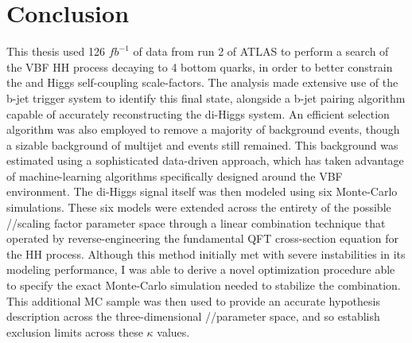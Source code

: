 \chapter{Conclusion}\label{chapter:conclusion}

This thesis used 126 $\textit{fb}^{-1}$ of data from run 2 of ATLAS
    to perform a search of the VBF \to HH process decaying to 4 bottom quarks,
    in order to better constrain the \kl and \kvv Higgs self-coupling scale-factors.
The analysis made extensive use of the b-jet trigger system to identify this final state,
    alongside a b-jet pairing algorithm capable of accurately reconstructing the di-Higgs system.
An efficient selection algorithm was also employed to remove a majority of background events,
    though a sizable background of multijet and \ttbar events still remained.
This background was estimated using a sophisticated data-driven approach,
    which has taken advantage of machine-learning algorithms specifically designed around the VBF environment.
The di-Higgs signal itself was then modeled using six Monte-Carlo simulations.
These six models were extended across the entirety of 
    the possible \kvv/\kl/\kvv scaling factor parameter space through a linear combination technique
    that operated by reverse-engineering the fundamental QFT cross-section equation for the HH process.
Although this method initially met with severe instabilities in its modeling performance,
    I was able to derive a novel optimization procedure able to specify
    the exact Monte-Carlo simulation needed to stabilize the combination.
This additional MC sample was then used to provide an accurate hypothesis description across
    the three-dimensional \kvv/\kl/\kv parameter space,
    and so establish exclusion limits across these $\kappa$ values. 

